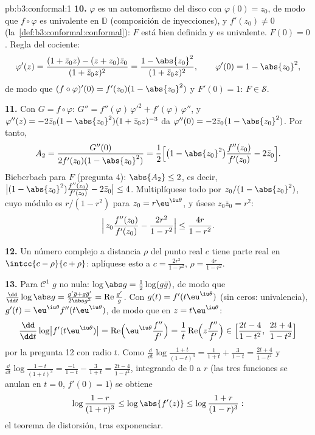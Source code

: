 \begin{solution}{pb:b3:conformal:1}
\textbf{10.} $\varphi$ es un automorfismo del disco con
$\varphi(0) = z_0$, de modo que $f\circ\varphi$ es univalente en
$\mathbb D$ (composición de inyecciones), y $f'(z_0) \neq
0$ (la~\cref{def:b3:conformal:conformal}): $F$ está bien definida y es
univalente. $F(0) = 0$. Regla del cociente:
\[
\varphi'(z) = \frac{(1 + \bar z_0z) - (z + z_0)\bar z_0}
{(1 + \bar z_0z)^2}
= \frac{1 - \abs{z_0}^2}{(1 + \bar z_0z)^2},
\qquad \varphi'(0) = 1 - \abs{z_0}^2 ,
\]
de modo que $(f\circ\varphi)'(0) = f'(z_0)(1 - \abs{z_0}^2)$ y
$F'(0) = 1$: $F \in \mathcal S$.

\textbf{11.} Con $G = f\circ\varphi$: $G'' =
f''(\varphi)\,\varphi'^2 + f'(\varphi)\,\varphi''$, y
$\varphi''(z) = -2\bar z_0(1 - \abs{z_0}^2)(1 + \bar
z_0z)^{-3}$ da $\varphi''(0) = -2\bar z_0(1 -
\abs{z_0}^2)$. Por tanto,
\[
A_2 = \frac{G''(0)}{2f'(z_0)(1 - \abs{z_0}^2)}
= \frac12\Bigl[\bigl(1 - \abs{z_0}^2\bigr)
\frac{f''(z_0)}{f'(z_0)} - 2\bar z_0\Bigr] .
\]
Bieberbach para $F$ (pregunta 4): $\abs{A_2} \leq 2$, es decir,
$\bigl|(1 - \abs{z_0}^2)\frac{f''(z_0)}{f'(z_0)} - 2\bar
z_0\bigr| \leq 4$. Multiplíquese todo por $z_0/(1 - \abs{z_0}^2)$, cuyo
módulo es $r/(1 - r^2)$ para $z_0 = r\eu^{\iu\theta}$, y úsese $z_0\bar
z_0 = r^2$:
\[
\Bigl|\,z_0\frac{f''(z_0)}{f'(z_0)} -
\frac{2r^2}{1 - r^2}\Bigr| \leq \frac{4r}{1 - r^2} .
\]

\textbf{12.} Un número complejo a distancia $\rho$ del punto real $c$
tiene parte real en $\intcc{c - \rho}{c +
\rho}$: aplíquese esto a $c = \frac{2r^2}{1-r^2}$, $\rho =
\frac{4r}{1-r^2}$.

\textbf{13.} Para $\mathcal C^1$ $g$ no nula:
$\log\abs g = \frac12\log(g\bar g)$, de modo que $\frac{\dd}{\dd
t}\log\abs g = \frac{g'\bar g + g\bar g'}{2\abs g^2} =
\operatorname{Re}\frac{g'}g$. Con $g(t) =
f'(t\eu^{\iu\theta})$ (sin ceros: univalencia), $g'(t) =
\eu^{\iu\theta}f''(t\eu^{\iu\theta})$, de modo que en $z =
t\eu^{\iu\theta}$:
\[
\frac{\dd}{\dd t}\log\bigl|f'(t\eu^{\iu\theta})\bigr|
= \operatorname{Re}\Bigl(\eu^{\iu\theta}
\frac{f''}{f'}\Bigr)
= \frac1t\operatorname{Re}\Bigl(z\frac{f''}{f'}\Bigr)
\in \Bigl[\frac{2t - 4}{1 - t^2},\
\frac{2t + 4}{1 - t^2}\Bigr]
\]
por la pregunta 12 con radio $t$. Como $\frac{\dd}{\dd
t}\log\frac{1+t}{(1-t)^3} = \frac1{1+t} + \frac3{1-t} =
\frac{2t+4}{1-t^2}$ y $\frac{\dd}{\dd
t}\log\frac{1-t}{(1+t)^3} = \frac{-1}{1-t} - \frac3{1+t} =
\frac{2t-4}{1-t^2}$, integrando de $0$ a $r$ (las tres funciones se
anulan en $t = 0$, $f'(0) = 1$) se obtiene
\[
\log\frac{1-r}{(1+r)^3} \leq \log\abs{f'(z)} \leq
\log\frac{1+r}{(1-r)^3} :
\]
el teorema de distorsión, tras exponenciar.


\end{solution}

